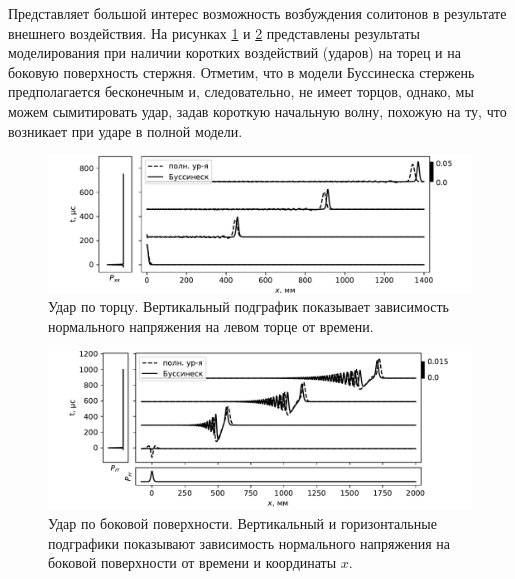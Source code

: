 \documentclass[12pt, a4paper]{article}
\begin{document}
Представляет большой интерес возможность возбуждения солитонов в результате внешнего воздействия. На рисунках \ref{fig:impact} и \ref{fig:impact_surf} представлены результаты моделирования при наличии коротких воздействий (ударов) на торец и на боковую поверхность стержня. Отметим, что в модели Буссинеска стержень предполагается бесконечным и, следовательно, не имеет торцов, однако, мы можем сымитировать удар, задав короткую начальную волну, похожую на ту, что возникает при ударе в полной модели.
\begin{figure}[h!]
	\centering
	\includegraphics[width=0.85\linewidth]{figures/ImpactSmall}
	\caption{Удар по торцу. Вертикальный подграфик показывает зависимость нормального напряжения на левом торце  от времени.}
	\label{fig:impact}
	\vspace{-3mm}
\end{figure}
\begin{figure}[h!]
	\centering
	\includegraphics[width=0.85\linewidth]{figures/SurfImpactSmall}
	\caption{Удар по боковой поверхности. Вертикальный и горизонтальные подграфики показывают зависимость нормального напряжения на боковой поверхности от времени и координаты $x$.}
	\label{fig:impact_surf}
	\vspace{-7mm}
\end{figure}




\end{document}
